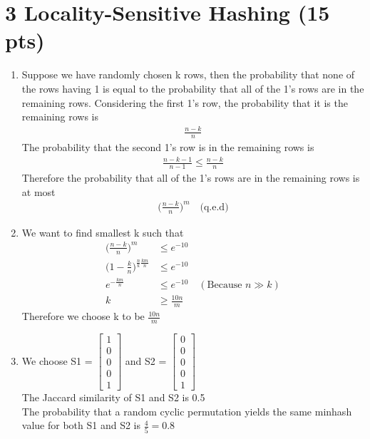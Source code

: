 \documentclass[12pt]{article}
\begin{document}
\section*{3 Locality-Sensitive Hashing (15 pts)}
\begin{enumerate}[label=(\alph*)]
	\item Suppose we have randomly chosen k rows, then the probability that none of the rows having 1 is equal to the probability that all of the 1's rows are in the remaining rows. Considering the first 1's row, the probability that it is the remaining rows is
	\begin{align*}
		\frac{n - k}{n}
	\end{align*}
	The probability that the second 1's row is in the remaining rows is
	\begin{align*}
		\frac{n - k - 1}{n - 1} \leq \frac{n - k}{n}
	\end{align*}
	Therefore the probability that all of the 1's rows are in the remaining rows is at most
	\begin{align*}
		\Big(\frac{n - k}{n}\Big)^m \quad \text{(q.e.d)}
	\end{align*}

	\item We want to find smallest k such that
	\begin{align*}
		\Big(\frac{n - k}{n}\Big)^m &\leq e^{-10} \\
		\Big(1 -\frac{k}{n}\Big)^{\frac{n}{k}\frac{km}{n}} &\leq e^{-10} \\
		e^{-\frac{km}{n}} &\leq e^{-10} \quad (\text{Because } n \gg k) \\ 
		k &\geq \frac{10n}{m}
	\end{align*}
	Therefore we choose k to be $\frac{10n}{m}$

	\item We choose
	S1 = $
	\begin{bmatrix}
		1 \\
		0 \\
		0 \\
		0 \\
		1
	\end{bmatrix}
	$ 
	and S2 = $
	\begin{bmatrix}
		0 \\
		0 \\
		0 \\
		0 \\
		1
	\end{bmatrix}
	$ \\
	The Jaccard similarity of S1 and S2 is 0.5 \\
	The probability that a random cyclic permutation yields the same minhash value for both S1 and S2 is $\frac{4}{5} = 0.8$
\end{enumerate}
\end{document}
